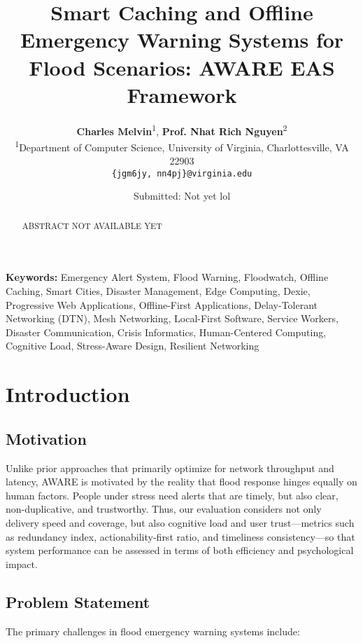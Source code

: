 \documentclass[11pt,twocolumn]{article}
\title{\Large\textbf{Smart Caching and Offline Emergency Warning Systems for Flood Scenarios: AWARE EAS Framework}}
\author{
    \textbf{Charles Melvin}\textsuperscript{1}, \textbf{Prof. Nhat Rich Nguyen}\textsuperscript{2} \\
    \small\textsuperscript{1}Department of Computer Science, University of Virginia, Charlottesville, VA 22903 \\
    \small\texttt{\{jgm6jy, nn4pj\}@virginia.edu}
}
\date{\small Submitted: Not yet lol}
\begin{document}
\maketitle

\begin{abstract}
\noindent ABSTRACT NOT AVAILABLE YET
\end{abstract}

\noindent\textbf{Keywords:} 
Emergency Alert System, Flood Warning, Floodwatch, Offline Caching, 
Smart Cities, Disaster Management, Edge Computing, Dexie, 
Progressive Web Applications, Offline-First Applications, 
Delay-Tolerant Networking (DTN), Mesh Networking, 
Local-First Software, Service Workers, 
Disaster Communication, Crisis Informatics, 
Human-Centered Computing, Cognitive Load, 
Stress-Aware Design, Resilient Networking

\vspace{0.3cm}

\section{Introduction}

\subsection{Motivation}

Unlike prior approaches that primarily optimize for network throughput and latency, AWARE is motivated by the reality that flood response hinges equally on human factors. People under stress need alerts that are timely, but also clear, non-duplicative, and trustworthy. Thus, our evaluation considers not only delivery speed and coverage, but also cognitive load and user trust—metrics such as redundancy index, actionability-first ratio, and timeliness consistency—so that system performance can be assessed in terms of both efficiency and psychological impact.


\subsection{Problem Statement}
The primary challenges in flood emergency warning systems include:
\end{document}
